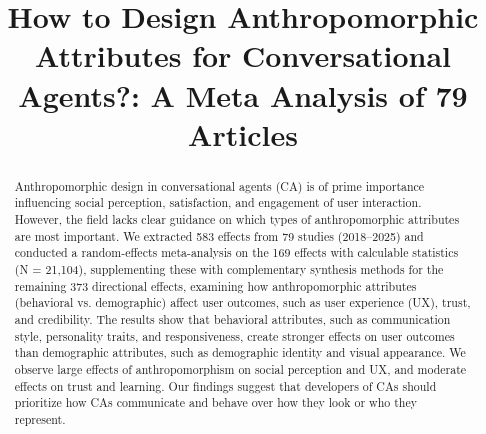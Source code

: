 \documentclass[manuscript,screen,review,anonymous]{acmart}
\DeclareRobustCommand{\change}[1]{%
    \textcolor{changeblue}{#1}%
  }
\DeclareRobustCommand{\change}[1]{#1}
\begin{document}
\title[Anthropomorphic Attributes for Conversational Agents]{How to Design Anthropomorphic Attributes for Conversational Agents?: A Meta Analysis of 79 Articles}


\begin{abstract}

Anthropomorphic design in conversational agents (CA) is of prime importance \change{influencing social perception, satisfaction, and engagement} of user interaction. However, the field lacks clear guidance on which types of anthropomorphic attributes are most important. \change{We extracted 583 effects from 79 studies (2018--2025) and conducted a random-effects meta-analysis on the 169 effects with calculable statistics (N = 21,104), supplementing these with complementary synthesis methods for the remaining 373 directional effects,} examining how anthropomorphic attributes (behavioral vs. demographic) affect user outcomes, such as user experience (UX), trust, and credibility. The results show that behavioral attributes, such as communication style, personality traits, and responsiveness, create stronger effects on user outcomes than demographic attributes, such as demographic identity and visual appearance. We observe large effects of anthropomorphism on social perception and UX, and moderate effects on trust and learning. Our findings suggest that developers of CAs should prioritize how CAs communicate and behave over how they look or who they represent.

\end{abstract}

\end{document}
